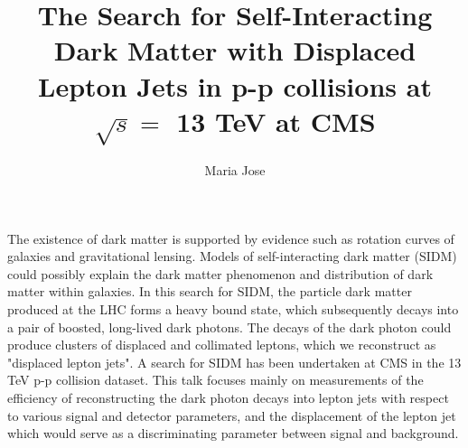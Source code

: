 \documentclass[12pt]{article}
\title{\textbf{The Search for Self-Interacting Dark Matter with Displaced Lepton Jets in p-p collisions  at $\sqrt{s} =$  13 TeV at CMS}}
\author{Maria Jose}
\date{}
\begin{document}
\maketitle
The existence of dark matter is supported by evidence such as rotation curves of galaxies and gravitational lensing. 
Models of self-interacting dark matter (SIDM) could possibly explain the dark matter phenomenon and distribution of dark matter within galaxies. 
In this search for SIDM, the particle dark matter produced at the LHC forms a heavy bound state, which subsequently decays into a pair of boosted, 
long-lived dark photons. The decays of the dark photon could produce clusters of displaced and collimated leptons, which we reconstruct as "displaced lepton jets". 
A search for SIDM has been undertaken at CMS in the 13 TeV p-p collision dataset. 
This talk focuses mainly on measurements of the efficiency of reconstructing the dark photon decays into lepton jets with respect to various signal and detector parameters, 
and the displacement of the lepton jet which would serve as a discriminating parameter between signal and background.


\end{document}
